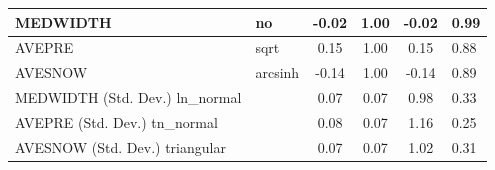 \begin{table}
\begin{center}
\begin{tabular}{|l|l|c|c|c|l|}
			\hline
			MEDWIDTH & no & -0.02 & 1.00 & -0.02 & 0.99 \\
			\hline
			AVEPRE & sqrt & 0.15 & 1.00 & 0.15 & 0.88 \\
			\hline
			AVESNOW & arcsinh & -0.14 & 1.00 & -0.14 & 0.89 \\
			\hline
			MEDWIDTH (Std. Dev.) ln_normal &  & 0.07 & 0.07 & 0.98 & 0.33 \\
			\hline
			AVEPRE (Std. Dev.) tn_normal &  & 0.08 & 0.07 & 1.16 & 0.25 \\
			\hline
			AVESNOW (Std. Dev.) triangular &  & 0.07 & 0.07 & 1.02 & 0.31 \\
			\hline
		\end{tabular}
	\end{center}
\end{table}